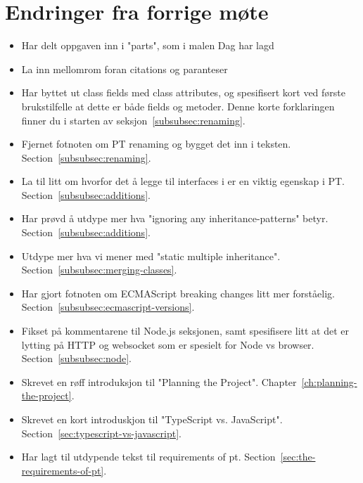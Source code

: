 
\chapter*{Endringer fra forrige møte}

\begin{itemize}
    \item Har delt oppgaven inn i "parts", som i malen Dag har lagd
    \item La inn mellomrom foran citations og paranteser
    \item Har byttet ut class fields med class attributes, og spesifisert kort ved første brukstilfelle at dette er både fields og metoder.
    Denne korte forklaringen finner du i starten av seksjon~\vref{subsubsec:renaming}.
    \item Fjernet fotnoten om PT renaming og bygget det inn i teksten.
    Section~\vref{subsubsec:renaming}.
    \item La til litt om hvorfor det å legge til interfaces i  er en viktig egenskap i PT.
    Section~\vref{subsubsec:additions}.
    \item Har prøvd å utdype mer hva "ignoring any inheritance-patterns" betyr.
    Section~\vref{subsubsec:additions}.
    \item Utdype mer hva vi mener med "static multiple inheritance".
    Section~\vref{subsubsec:merging-classes}.
    \item Har gjort fotnoten om ECMAScript breaking changes litt mer forståelig.
    Section~\vref{subsubsec:ecmascript-versions}.
    \item Fikset på kommentarene til Node.js seksjonen, samt spesifisere litt at det er lytting på HTTP og websocket som er spesielt for Node vs browser.
    Section~\vref{subsubsec:node}.
    \item Skrevet en røff introduksjon til "Planning the Project".
    Chapter~\vref{ch:planning-the-project}.
    \item Skrevet en kort introduskjon til "TypeScript vs. JavaScript".
    Section~\vref{sec:typescript-vs-javascript}.
    \item Har lagt til utdypende tekst til requirements of pt.
    Section~\vref{sec:the-requirements-of-pt}.
\end{itemize}

